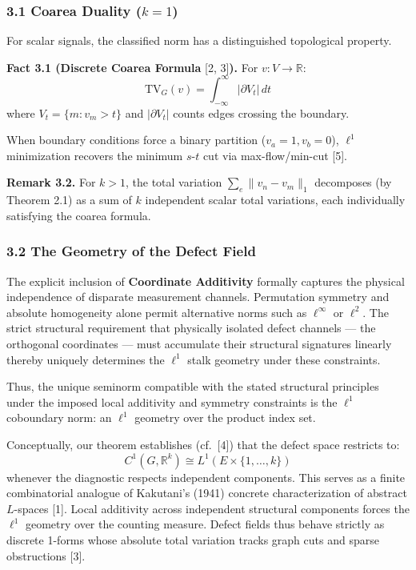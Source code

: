 \documentclass[
]{article}
\begin{document}
\subsubsection{\texorpdfstring{3.1 Coarea Duality
(\(k = 1\))}{3.1 Coarea Duality (k = 1)}}\label{coarea-duality-k-1}

For scalar signals, the classified norm has a distinguished topological
property.

\textbf{Fact 3.1 (Discrete Coarea Formula} {[}2, 3{]}\textbf{).} For
\(v: V \to \mathbb{R}\):
\[ \text{TV}_G(v) = \int_{-\infty}^{\infty} |\partial V_t| \, dt \]
where \(V_t = \{m : v_m > t\}\) and \(|\partial V_t|\) counts edges
crossing the boundary.

When boundary conditions force a binary partition
(\(v_a = 1, v_b = 0\)), \(\ell^1\) minimization recovers the minimum
\(s\)-\(t\) cut via max-flow/min-cut {[}5{]}.

\textbf{Remark 3.2.} For \(k > 1\), the total variation
\(\sum_e \|v_n - v_m\|_1\) decomposes (by Theorem 2.1) as a sum of \(k\)
independent scalar total variations, each individually satisfying the
coarea formula.

\subsubsection{3.2 The Geometry of the Defect
Field}\label{the-geometry-of-the-defect-field}

The explicit inclusion of \textbf{Coordinate Additivity} formally
captures the physical independence of disparate measurement channels.
Permutation symmetry and absolute homogeneity alone permit alternative
norms such as \(\ell^\infty\) or \(\ell^2\). The strict structural
requirement that physically isolated defect channels --- the orthogonal
coordinates --- must accumulate their structural signatures linearly
thereby uniquely determines the \(\ell^1\) stalk geometry under these
constraints.

Thus, the unique seminorm compatible with the stated structural
principles under the imposed local additivity and symmetry constraints
is the \(\ell^1\) coboundary norm: an \(\ell^1\) geometry over the
product index set.

Conceptually, our theorem establishes (cf.~{[}4{]}) that the defect
space restricts to:
\[ C^1(G,\mathbb{R}^k) \cong L^1(E \times \{1,\dots,k\}) \] whenever the
diagnostic respects independent components. This serves as a finite
combinatorial analogue of Kakutani's (1941) concrete characterization of
abstract \(L\)-spaces {[}1{]}. Local additivity across independent
structural components forces the \(\ell^1\) geometry over the counting
measure. Defect fields thus behave strictly as discrete 1-forms whose
absolute total variation tracks graph cuts and sparse obstructions
{[}3{]}.
\end{document}
